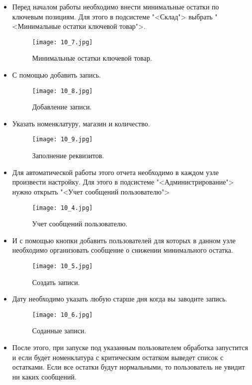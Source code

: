 \begin{itemize}
	\item Перед началом работы необходимо внести минимальные остатки по ключевым позициям. Для этого в подсистеме "<Склад">
		  выбрать "<Минимальные остатки ключевой товар">.
  	\begin{figure}[H]
		  	\texttt{[image: 10\_7.jpg]}
		  	\caption{Минимальные остатки ключевой товар.}
		  	\label{ris:10_7.jpg}
  \end{figure}
	\item С помощью   добавить запись. 
  	\begin{figure}[H]
		\texttt{[image: 10\_8.jpg]}
		\caption{Добавление записи.}
		\label{ris:10_8.jpg}
	\end{figure}
	\item Указать номенклатуру, магазин и количество.	
  	\begin{figure}[H]
		\texttt{[image: 10\_9.jpg]}
		\caption{Заполнение реквизитов.}
		\label{ris:10_9.jpg}
	\end{figure}
	\item Для автоматической работы этого отчета необходимо в каждом узле произвести настройку. Для этого в подсистеме "<Администрирование">  нужно открыть "<Учет сообщений пользователю">
	\begin{figure}[H]
		\texttt{[image: 10\_4.jpg]}
		\caption{Учет сообщений пользователю.}
		\label{ris:10_4.jpg}
	\end{figure}
	\item И с помощью кнопки   добавить пользователей для которых в данном узле необходимо организовать сообщение о снижении минимального остатка.
	\begin{figure}[H]
		\texttt{[image: 10\_5.jpg]}
		\caption{Создать записи.}
		\label{ris:10_5.jpg}
	\end{figure}
	\item Дату необходимо указать любую старше дня когда вы заводите запись.
	\begin{figure}[H]
		\texttt{[image: 10\_6.jpg]}
		\caption{Соданные записи.}
		\label{ris:10_6.jpg}
	\end{figure}	
	\item После этого, при запуске под указанным пользователем обработка запустится и если будет номенклатура с критическим остатком выведет список с остатками. Если все остатки будут нормальными, то пользователь не увидит ни каких сообщений.

\end{itemize}